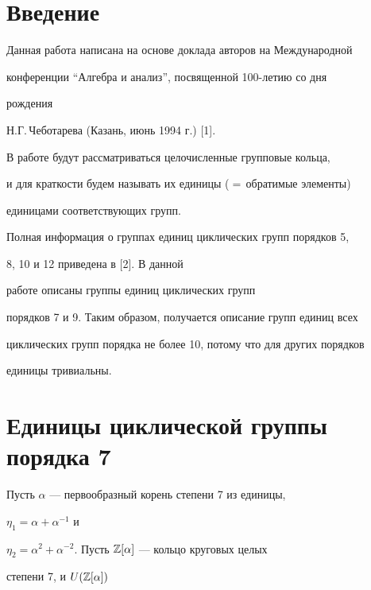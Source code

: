 \maketitle 


\label{begin} 


 


\section{Введение} 


 


Данная работа написана на основе доклада авторов на Международной 


конференции ``Алгебра и анализ'', посвященной 100-летию со дня 


рождения  


Н.Г.\,Чеботарева (Казань, июнь 1994 г.) [1]. 


В работе будут рассматриваться целочисленные групповые кольца,  


и для краткости будем называть их единицы ($=$\,обратимые элементы)  


единицами соответствующих групп. 


Полная информация о группах единиц циклических групп порядков 5,  


8, 10 и 12 приведена в [2]. В данной 


работе описаны группы единиц циклических групп  


порядков 7 и 9. Таким образом, получается описание групп единиц всех  


циклических групп порядка не более 10, потому что для других порядков  


единицы тривиальны. 


 


\section{Единицы циклической группы порядка 7} 


 


Пусть $\alpha$ --- первообразный корень степени 7 из единицы, 


$\eta_1=\alpha+\alpha^{-1}$ и 


$\eta_2=\alpha^2+\alpha^{-2}$. Пусть $\Bbb Z[\alpha]$ --- кольцо круговых целых 


степени 7, и $U(\Bbb Z[\alpha])$ 


